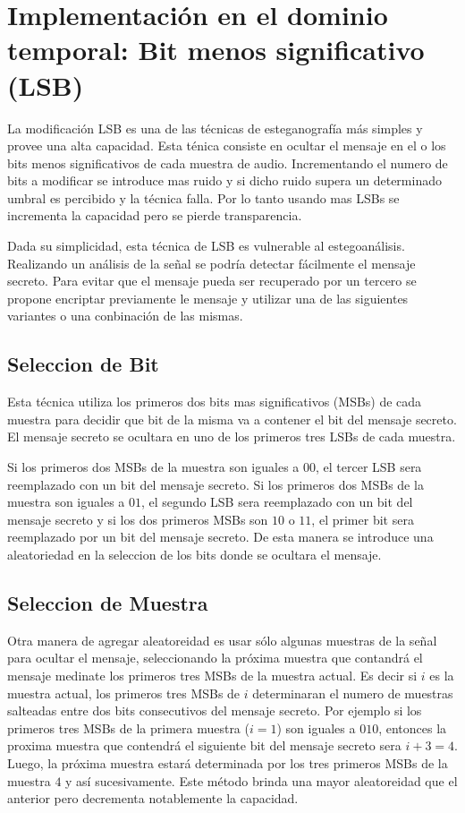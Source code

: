 \documentclass[conference,a4paper,10pt, oneside,final]{tfmpd}
\begin{document}
\section{Implementación en el dominio temporal: Bit menos significativo (LSB)}
La modificación LSB es una de las técnicas de esteganografía más simples y provee una alta capacidad. Esta ténica consiste en ocultar el mensaje en el o los bits menos significativos de cada muestra de audio.
Incrementando el numero de bits a modificar se introduce mas ruido y si dicho ruido supera un determinado umbral es percibido y la técnica falla. Por lo tanto usando mas LSBs se incrementa la capacidad pero se pierde transparencia.

Dada su simplicidad, esta técnica de LSB es vulnerable al estegoanálisis. Realizando un análisis de la señal se podría detectar fácilmente el mensaje secreto. Para evitar que el mensaje pueda ser recuperado por un tercero se propone encriptar previamente le mensaje y utilizar una de las siguientes variantes o una conbinación de las mismas.

\subsection{Seleccion de Bit}
Esta técnica utiliza los primeros dos bits mas significativos (MSBs) de cada muestra para decidir que bit de la misma va a contener el bit del mensaje secreto. El mensaje secreto se ocultara en uno de los primeros tres LSBs de cada muestra.

Si los primeros dos MSBs de la muestra son iguales a $00$, el tercer LSB sera reemplazado con un bit del mensaje secreto. Si los primeros dos MSBs de la muestra son iguales a $01$, el segundo LSB sera reemplazado con un bit del mensaje secreto y si los dos primeros MSBs son $10$ o $11$, el primer bit sera reemplazado por un bit del mensaje secreto.
De esta manera se introduce una aleatoriedad en la seleccion de los bits donde se ocultara el mensaje.

\subsection{Seleccion de Muestra}
Otra manera de agregar aleatoreidad es usar sólo algunas muestras de la señal para ocultar el mensaje, seleccionando la próxima muestra que contandrá el mensaje medinate los primeros tres MSBs de la muestra actual. Es decir si $i$ es la muestra actual, los primeros tres MSBs de $i$ determinaran el numero de muestras salteadas entre dos bits consecutivos del mensaje secreto. Por ejemplo si los primeros tres MSBs de la primera muestra ($i=1$) son iguales a $010$, entonces la proxima muestra que contendrá el siguiente bit del mensaje secreto sera $i+3=4$. Luego, la próxima muestra estará determinada por los tres primeros MSBs de la muestra $4$ y así sucesivamente. Este método brinda una mayor aleatoreidad que el anterior pero decrementa notablemente la capacidad.
\end{document}
